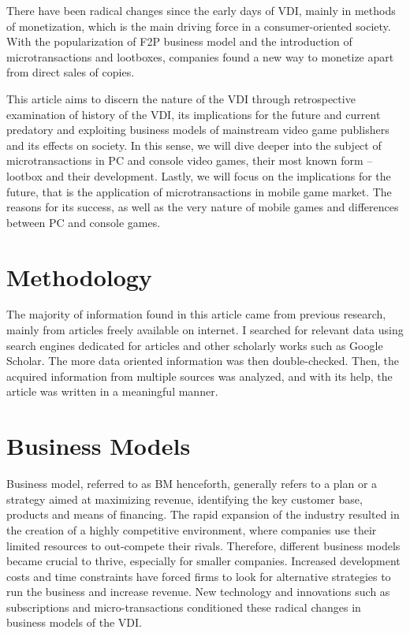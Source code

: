 \documentclass[10pt,british,a4paper,titlepage]{article}
\begin{document}
There have been radical changes since the early days of VDI, mainly in methods of monetization, which is the main driving force in a consumer-oriented society. With the popularization of F2P business model and the introduction of microtransactions and lootboxes, companies found a new way to monetize apart from direct sales of copies. 

This article aims to discern the nature of the VDI through retrospective examination of history of the VDI, its implications for the future and current predatory and exploiting business models of mainstream video game publishers and its effects on society.
In this sense, we will dive deeper into the subject of microtransactions in PC and console video games, their most known form – lootbox and their development. 
Lastly, we will focus on the implications for the future, that is the application of microtransactions in mobile game market. The reasons for its success, as well as the very nature of mobile games and differences between PC and console games.


\section{Methodology}

The majority of information found in this article came from previous research, mainly from articles freely available on internet. I searched for relevant data  using search engines dedicated for articles and other scholarly works such as Google Scholar. The more data oriented information was then double-checked. Then, the acquired information from multiple sources was analyzed, and with its help, the article was written in a meaningful manner. 
 

\section{Business Models} 
Business model, referred to as BM henceforth, generally refers to a plan or a strategy aimed at maximizing revenue, identifying the key customer base, products and means of financing. The rapid expansion of the industry resulted in the creation of a highly competitive environment, where companies use their limited resources to out-compete their rivals\cite{osathanunkul2015classification:business}. Therefore, different business models became crucial to thrive, especially for smaller companies. Increased development costs and time constraints have forced firms to look for alternative strategies to run the business and increase revenue. New technology and innovations such as subscriptions and micro-transactions conditioned these radical changes in business models of the VDI\cite{osathanunkul2015classification:business}.
\end{document}
